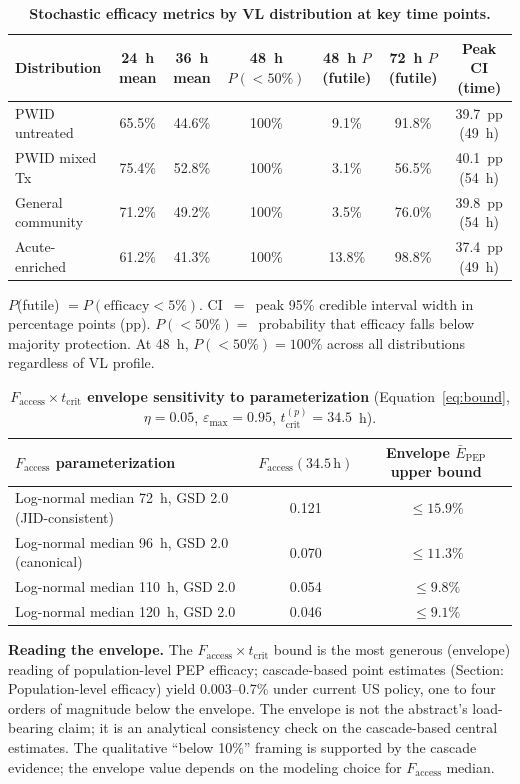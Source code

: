 \documentclass[11pt]{article}
\theoremstyle{definition}
\theoremstyle{remark}
\newcommand{\Ebarpep}{\bar{E}_{\text{PEP}}}
\newcommand{\Faccess}{F_{\text{access}}}
\newcommand{\tcrit}{t_{\text{crit}}}
\newcommand{\emax}{\varepsilon_{\max}}
\begin{document}
\begin{table}[H]
\centering
\caption{\textbf{Stochastic efficacy metrics by VL distribution at key time points.}}
\label{tab:stochastic}
\small
\begin{tabular}{@{}lcccccc@{}}
\toprule
\textbf{Distribution} & \textbf{24~h mean} & \textbf{36~h mean} & \textbf{48~h $P(<50\%)$} & \textbf{48~h $P$(futile)} & \textbf{72~h $P$(futile)} & \textbf{Peak CI (time)} \\
\midrule
PWID untreated      & 65.5\% & 44.6\% & 100\% & 9.1\%  & 91.8\% & 39.7~pp (49~h) \\
PWID mixed Tx       & 75.4\% & 52.8\% & 100\% & 3.1\%  & 56.5\% & 40.1~pp (54~h) \\
General community   & 71.2\% & 49.2\% & 100\% & 3.5\%  & 76.0\% & 39.8~pp (54~h) \\
Acute-enriched      & 61.2\% & 41.3\% & 100\% & 13.8\% & 98.8\% & 37.4~pp (49~h) \\
\bottomrule
\end{tabular}

\vspace{0.3em}
\footnotesize
$P$(futile) $= P(\text{efficacy} < 5\%)$. CI~$=$~peak 95\% credible interval width in percentage points (pp). $P(<50\%) =$~probability that efficacy falls below majority protection. At 48~h, $P(<50\%) = 100\%$ across all distributions regardless of VL profile.
\end{table}

\begin{table}[H]
\centering
\caption{\textbf{$\Faccess \times \tcrit$ envelope sensitivity to parameterization} (Equation~\ref{eq:bound}, $\eta = 0.05$, $\emax = 0.95$, $\tcrit^{(p)} = 34.5$~h).}
\label{tab:bound}
\small
\begin{tabular}{@{}lcc@{}}
\toprule
\textbf{$\Faccess$ parameterization} & \textbf{$\Faccess(34.5\,\text{h})$} & \textbf{Envelope $\Ebarpep$ upper bound} \\
\midrule
Log-normal median 72~h, GSD 2.0 (JID-consistent)  & 0.121 & $\leq 15.9\%$ \\
Log-normal median 96~h, GSD 2.0 (canonical)       & 0.070 & $\leq 11.3\%$ \\
Log-normal median 110~h, GSD 2.0                  & 0.054 & $\leq 9.8\%$  \\
Log-normal median 120~h, GSD 2.0                  & 0.046 & $\leq 9.1\%$  \\
\bottomrule
\end{tabular}

\vspace{0.3em}
\footnotesize
\textbf{Reading the envelope.} The $\Faccess \times \tcrit$ bound is the most generous (envelope) reading of population-level PEP efficacy; cascade-based point estimates (Section: Population-level efficacy) yield 0.003--0.7\% under current US policy, one to four orders of magnitude below the envelope. The envelope is not the abstract's load-bearing claim; it is an analytical consistency check on the cascade-based central estimates. The qualitative ``below 10\%'' framing is supported by the cascade evidence; the envelope value depends on the modeling choice for $\Faccess$ median.
\end{table}
\end{document}
